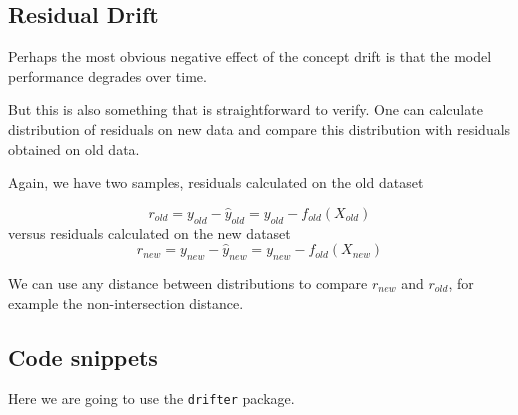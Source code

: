 \documentclass[12pt,]{krantz}
\newenvironment{Shaded}{\begin{snugshade}}{\end{snugshade}}
\newcommand{\ControlFlowTok}[1]{\textcolor[rgb]{0.13,0.29,0.53}{\textbf{#1}}}
\newcommand{\DataTypeTok}[1]{\textcolor[rgb]{0.13,0.29,0.53}{#1}}
\newcommand{\DecValTok}[1]{\textcolor[rgb]{0.00,0.00,0.81}{#1}}
\newcommand{\KeywordTok}[1]{\textcolor[rgb]{0.13,0.29,0.53}{\textbf{#1}}}
\newcommand{\NormalTok}[1]{#1}
\newcommand{\OperatorTok}[1]{\textcolor[rgb]{0.81,0.36,0.00}{\textbf{#1}}}
\newcommand{\StringTok}[1]{\textcolor[rgb]{0.31,0.60,0.02}{#1}}
\begin{document}
\hypertarget{residual-drift}{%
\subsection{Residual Drift}\label{residual-drift}}

Perhaps the most obvious negative effect of the concept drift is that the model performance degrades over time.

But this is also something that is straightforward to verify. One can calculate distribution of residuals on new data and compare this distribution with residuals obtained on old data.

Again, we have two samples, residuals calculated on the old dataset

\[
r_{old} = y_{old} - \hat y_{old} = y_{old} - f_{old}(X_{old})
\]
versus residuals calculated on the new dataset
\[
r_{new} = y_{new} - \hat y_{new} = y_{new} - f_{old}(X_{new})
\]

We can use any distance between distributions to compare \(r_{new}\) and \(r_{old}\), for example the non-intersection distance.

\hypertarget{code-snippets}{%
\subsection{Code snippets}\label{code-snippets}}

Here we are going to use the \texttt{drifter} package.

\begin{Shaded}
\end{Shaded}
\end{document}
